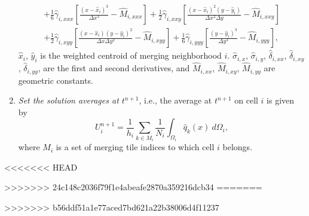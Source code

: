 \begin{enumerate}[label=Step \arabic*:]
\begin{equation}
\begin{aligned}
	    + \frac{1}{6}\hat\gamma_{i, xxx}\left[ \frac{(x -  \hat x_i)^3 }{\Delta x^3} -  \hat M_{i,xxx}\right] + \frac{1}{2}\hat \gamma_{i, xxy}\left[ \frac{(x - \hat x_i)^2 (y -  \hat y_i) }{\Delta x^2 \Delta y} -  \hat M_{i,xxy}\right]\\
	     + \frac{1}{2}\hat \gamma_{i, xyy}\left[ \frac{(x -  \hat x_i) (y -  \hat y_i)^2 }{\Delta x \Delta y ^2} -  \hat M_{i,xyy}\right]+ \frac{1}{6}\hat \gamma_{i, yyy}\left[ \frac{(y -  \hat y_i)^3 }{\Delta y^3} -  \hat M_{i,yyy}\right],
\end{aligned}
\end{equation}
$\hat x_i$, $\hat y_i$ is the weighted centroid of merging neighborhood $i$. $\hat \sigma_{i,x}$, $\hat \sigma_{i,y}$, $\hat \delta_{i,xx}$, $\hat \delta_{i,xy}$, $\hat \delta_{i,yy}$, are the first and second derivatives, and $ \hat M_{i,xx}$, $\hat M_{i,xy}$,  $\hat M_{i,yy}$ are geometric constants. 

\item \textit{Set the solution averages at $t^{n+1}$}, i.e., the average at $t^{n+1}$ on cell $i$ is given by
	\begin{equation}\label{eq:final_update}
	U^{n+1}_i =  \frac{1}{h_i}\sum_{k \in M_{i}}\frac{1}{N_i}\int_{\Omega_i} \hat q_k(x)~d\Omega_i,
	\end{equation}
	where $M_i$ is a set of merging tile indices to which cell $i$ belongs.
\end{enumerate}

<<<<<<< HEAD
	
>>>>>>> 24c148c2036f79f1e4abeafe2870a359216dcb34
=======



	
>>>>>>> b56ddf51a1e77aced7bd621a22b38006d4f11237
